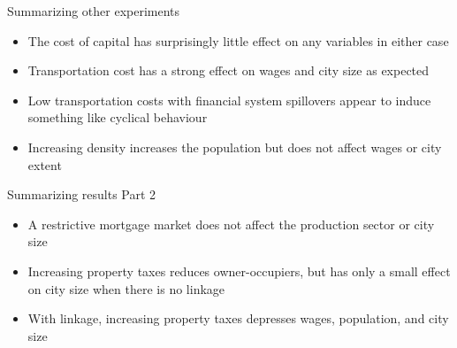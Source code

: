 \documentclass[]{beamer} %
\begin{document}

\begin{frame}{Summarizing other experiments} \Large
\begin {itemize}%

\item  The cost of capital has surprisingly little effect on any variables in either case

\item  Transportation cost has a strong effect on wages and city size as expected 
 
\item Low transportation costs with financial system spillovers appear to induce something like cyclical behaviour

\item  Increasing density increases the population but does not affect wages or city extent
\end{itemize}
\end{frame}%





\begin{frame}{Summarizing results Part 2 } \Large
\begin {itemize}%
\item A restrictive mortgage market does not affect the production sector or city size

\item  Increasing property taxes reduces owner-occupiers, but has only a small effect on city size when there is no linkage 
 
\item  With linkage, increasing property taxes depresses wages, population, and city size
\end{itemize}
\end{frame}%
\end{document}
